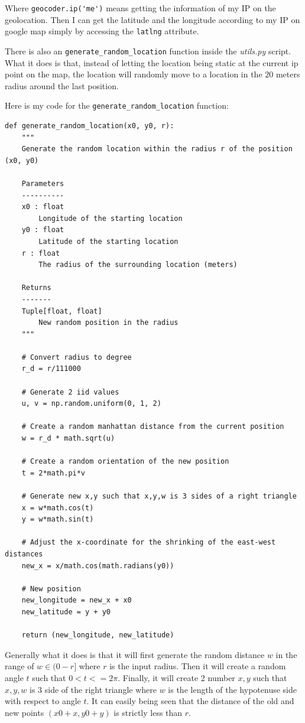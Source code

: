 \documentclass[a4paper,11pt]{article}
\theoremstyle{mytheor}
\begin{document}
Where \lstinline{geocoder.ip('me')} means getting the information of my IP on the geolocation. Then I can get the latitude and the longitude according to my IP on google map simply by accessing the \lstinline{latlng} attribute.

There is also an \lstinline{generate_random_location} function inside the \textit{utils.py} script. What it does is that, instead of letting the location being static at the current ip point on the map, the location will randomly move to a location in the $20$ meters radius around the last position.

Here is my code for the \lstinline{generate_random_location} function:

\begin{lstlisting}
def generate_random_location(x0, y0, r):
    """
    Generate the random location within the radius r of the position (x0, y0)

    Parameters
    ----------
    x0 : float
        Longitude of the starting location
    y0 : float
        Latitude of the starting location
    r : float
        The radius of the surrounding location (meters)

    Returns
    -------
    Tuple[float, float]
        New random position in the radius
    """

    # Convert radius to degree
    r_d = r/111000

    # Generate 2 iid values
    u, v = np.random.uniform(0, 1, 2)

    # Create a random manhattan distance from the current position
    w = r_d * math.sqrt(u)

    # Create a random orientation of the new position
    t = 2*math.pi*v

    # Generate new x,y such that x,y,w is 3 sides of a right triangle
    x = w*math.cos(t)
    y = w*math.sin(t)

    # Adjust the x-coordinate for the shrinking of the east-west distances
    new_x = x/math.cos(math.radians(y0))

    # New position
    new_longitude = new_x + x0
    new_latitude = y + y0

    return (new_longitude, new_latitude)
\end{lstlisting}

Generally what it does is that it will first generate the random distance $w$ in the range of $w \in (0-r]$ where $r$ is the input radius. Then it will create a random angle $t$ such that $0 < t <= 2\pi$. Finally, it will create 2 number $x, y$ such that $x, y, w$ is 3 side of the right triangle where $w$ is the length of the hypotenuse side with respect to angle $t$. It can easily being seen that the distance of the old and new points $(x0+x, y0+y)$ is strictly less than $r$.
\end{document}

